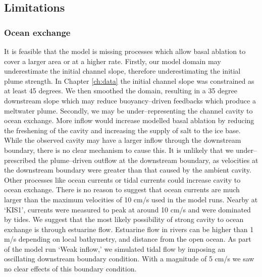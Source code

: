 \subsection{Limitations}

\subsubsection{Ocean exchange}
It is feasible that the model is missing processes which allow basal ablation to cover a larger area or at a higher rate. 
Firstly, our model domain may underestimate the initial channel slope, therefore underestimating the initial plume strength. In Chapter \ref{ch:data} the initial channel slope was constrained as at least 45 degrees. We then smoothed the domain, resulting in a 35 degree downstream slope which may reduce buoyancy--driven feedbacks which produce a meltwater plume. 
Secondly, we may be under--representing the channel cavity to ocean exchange. More inflow would increase modelled basal ablation by reducing the freshening of the cavity and increasing the supply of salt to the ice base. While the observed cavity may have a larger inflow through the downstream boundary, there is no clear  mechanism to cause this. It is unlikely that we under--prescribed the plume--driven outflow at the downstream boundary, as velocities at the downstream boundary were greater than that caused by the ambient cavity. Other processes like ocean currents or tidal currents could increase cavity to ocean exchange. 
There is no reason to suggest that ocean currents are much larger than the maximum velocities of 10 cm/s used in the model runs. Nearby at `KIS1', currents were measured to peak at around 10 cm/s and were dominated by tides. 
We suggest that the most likely possibility of strong cavity to ocean exchange is through estuarine flow. Estuarine flow in rivers can be higher than 1 m/s \citep{nepf1996intratidal} depending on local bathymetry, and distance from the open ocean. As part of the model run `Weak inflow,' we simulated tidal flow by imposing an oscillating downstream boundary condition. With a magnitude of 5 cm/s we saw no clear effects of this boundary condition. 

